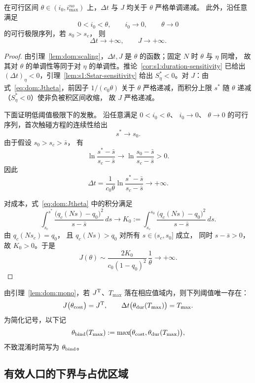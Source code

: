 \documentclass[lang=cn,a4paper,newtx]{elegantpaper}
\numberwithin{equation}{section}
\theoremstyle{plain}
\begin{document}
\begin{lemma}\label{lem:dom:mono}
在可行区间
$\theta\in(i_0,i_{\max}^{no})$
上，$\Delta t$ 与 $J$ 均关于 $\theta$
严格单调递减。
此外，沿任意满足
\[
0<i_0<\theta,\qquad
i_0\to0,\qquad
\theta\to0
\]
的可行极限序列，若 $s_0>s_c$，
则
\[
\Delta t\to+\infty,
\qquad
J\to+\infty.
\]
\end{lemma}
\begin{proof}
由引理~\ref{lem:dom:scaling}，$\Delta t,J$ 是 $\theta$ 的函数；固定 $N$ 时 $\theta$ 与 $\eta$ 同增，
故其对 $\theta$ 的单调性等同于对 $\eta$ 的单调性。推论~\ref{cor:s1:duration-sensitivity} 已给出
$(\Delta t)_\eta<0$，引理~\ref{lem:s1:Sstar-sensitivity} 给出 $S^\ast_\eta<0$。对 $J$：由
式~\eqref{eq:dom:Jtheta}，前因子 $1/(c_0\theta)$
关于 $\theta$ 严格递减，而积分上限 $s^*$ 随 $\theta$ 递减（$S^\ast_\eta<0$）使非负被积区间收缩，
故 $J$ 严格递减。

下面证明低阈值极限下的发散。
沿任意满足
$0<i_0<\theta$、
$i_0\to0$、
$\theta\to0$
的可行序列，首次触碰方程的连续性给出
\[
  s^\ast\longrightarrow s_0.
\]
由于假设 $s_0>s_c>\bar s$，
有
\[
  \ln\frac{s^\ast-\bar s}{s_c-\bar s}
  \longrightarrow
  \ln\frac{s_0-\bar s}{s_c-\bar s}
  >0.
\]
因此
\[
  \Delta t
  =
  \frac{1}{c_0\theta}
  \ln\frac{s^\ast-\bar s}{s_c-\bar s}
  \longrightarrow+\infty.
\]

对成本，式~\eqref{eq:dom:Jtheta} 中的积分满足
\[
\int_{s_c}^{s^\ast}
\frac{\bigl(q_c(Ns)-q_0\bigr)^2}
     {s-\bar s}\,ds
\longrightarrow
K_0
:=
\int_{s_c}^{s_0}
\frac{\bigl(q_c(Ns)-q_0\bigr)^2}
     {s-\bar s}\,ds.
\]
由
$q_c(Ns_c)=q_0$，
且 $q_c(Ns)>q_0$ 对所有
$s\in(s_c,s_0]$ 成立，
同时 $s-\bar s>0$，
故 $K_0>0$。于是
\[
  J(\theta)
  \sim
  \frac{2K_0}
       {c_0(1-q_0)^2}\,
  \frac{1}{\theta}
  \longrightarrow+\infty.
\]
\end{proof}

由引理~\ref{lem:dom:mono}，若 $J^{\rm T}$、$T_{\max}$ 落在相应值域内，则下列阈值唯一存在：
\begin{equation}
  J\big(\theta_{\rm cost}\big)=J^{\rm T},\qquad
  \Delta t\big(\theta_{\rm dur}(T_{\max})\big)=T_{\max}.
  \label{eq:dom:thetadefs}
\end{equation}
为简化记号，以下记
\begin{equation}
  \theta_{\rm bind}(T_{\max})
  :=
  \max\!\bigl(
    \theta_{\rm cost},
    \theta_{\rm dur}(T_{\max})
  \bigr),
  \label{eq:dom:theta-bind}
\end{equation}
不致混淆时简写为 $\theta_{\rm bind}$。

\subsection{有效人口的下界与占优区域}
\label{sec:dom:region}
\end{document}
